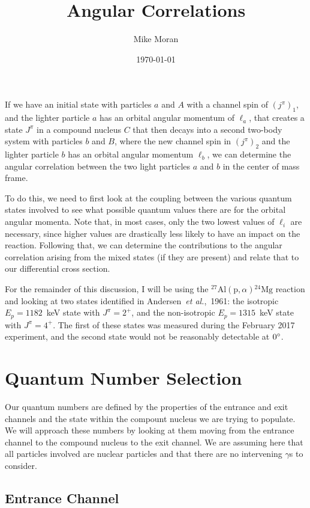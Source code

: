 \documentclass[10pt]{amsart}
\title{Angular Correlations}
\author{Mike Moran}
\date{\today}
\numberwithin{equation}{subsection}
\newcommand{\mnuc}[2]{{}^{#1}\textrm{#2}}
\newcommand{\react}[4]{$#1(#2,#3)#4$}
\newcommand{\alpa}{\react{\mnuc{27}{Al}}{\textrm{p}}{\alpha}{\mnuc{24}{Mg}}}
\begin{document}
\maketitle

If we have an initial state with particles $a$ and $A$ with a channel spin of
$(j^{\pi})_1$, and the lighter particle $a$ has an orbital angular momentum of
$\ell_a$, that creates a state $J^{\pi}$ in a compound nucleus $C$ that then
decays into a second two-body system with particles $b$ and $B$, where the new
channel spin in $(j^{\pi})_2$ and the lighter particle $b$ has an orbital
angular momentum $\ell_b$, we can determine the angular correlation between the
two light particles $a$ and $b$ in the center of mass frame.

To do this, we need to first look at the coupling between the various quantum
states involved to see what possible quantum values there are for the orbital
angular momenta. Note that, in most cases, only the two lowest values of
$\ell_i$ are necessary, since higher values are drastically less likely to have
an impact on the reaction. Following that, we can determine the contributions
to the angular correlation arising from the mixed states (if they are present)
and relate that to our differential cross section.

For the remainder of this discussion, I will be using the \alpa{} reaction and
looking at two states identified in Andersen~\textit{et al.},~1961: the
isotropic $E_p = 1182$~keV state with $J^{\pi} = 2^+$, and the non-isotropic
$E_p = 1315$~keV state with $J^{\pi} = 4^+$. The first of these states was
measured during the February 2017 experiment, and the second state would not be
reasonably detectable at $0\degree$.


\section{Quantum Number Selection}

Our quantum numbers are defined by the properties of the entrance and exit
channels and the state within the compount nucleus we are trying to populate.
We will approach these numbers by looking at them moving from the entrance
channel to the compound nucleus to the exit channel. We are assuming here that
all particles involved are nuclear particles and that there are no intervening
$\gamma$s to consider.

\subsection{Entrance Channel}
\end{document}
